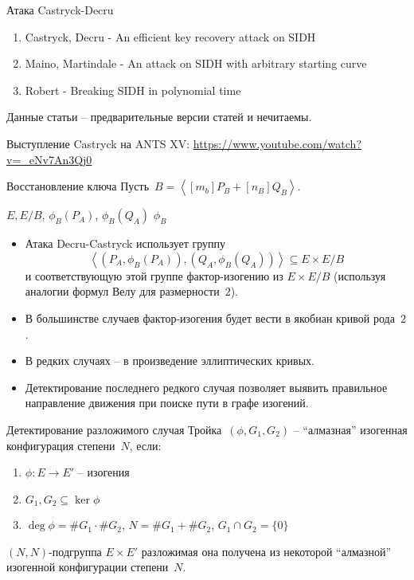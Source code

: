 \documentclass{beamer}
\begin{document}
\begin{frame}{Атака Castryck-Decru}
\begin{enumerate}
	\item Castryck, Decru - An efficient key recovery attack on SIDH
	\item Maino, Martindale - An attack on SIDH with arbitrary starting curve
	\item Robert - Breaking SIDH in polynomial time
\end{enumerate}
Данные статьи -- предварительные версии статей и нечитаемы.
\vspace*{1em}

Выступление Castryck на ANTS XV:
\url{https://www.youtube.com/watch?v=_eNv7An3Qj0}
\end{frame}

\begin{frame}{Восстановление ключа}
Пусть~$B = \left< [m_b] P_B + [n_B] Q_B \right>$.

\vspace*{1em}

\begin{center}
$E, E/B$, $\phi_B(P_A)$, $\phi_B(Q_A)$ \structure{$\Longrightarrow$} $\phi_B$
\end{center}
\begin{itemize}
	\item
	Атака Decru-Castryck использует группу
	\[
	\left< (P_A, \phi_B(P_A)), (Q_A, \phi_B(Q_A)) \right> \subseteq E \times E/B
	\]
	и соответствующую этой группе фактор-изогению из $E \times E/B$ (используя аналогии формул Велу для размерности~$2$).
	\item В большинстве случаев фактор-изогения будет вести в якобиан кривой рода~$2$.
	\item В редких случаях -- в произведение эллиптических кривых.
	\item Детектирование последнего редкого случая позволяет выявить правильное направление движения при поиске пути в графе изогений.
\end{itemize}
\end{frame}

\begin{frame}{Детектирование разложимого случая}
Тройка~$(\phi, G_1, G_2)$ -- ``алмазная'' изогенная конфигурация степени~$N$, если:
\begin{enumerate}
	\item $\phi: E \rightarrow E'$ -- изогения
	\item $G_1, G_2 \subseteq \ker{\phi}$
	\item $\deg{\phi} = \#G_1 \cdot \#G_2$, $N = \#G_1  + \#G_2$, $G_1 \cap G_2 = \{ 0 \}$
\end{enumerate}
\vspace*{1em}

$(N,N)$-подгруппа $E \times E'$ разложимая \structure{$\iff$} она получена из некоторой ``алмазной'' изогенной конфигурации степени~$N$.
\end{frame}
\end{document}
